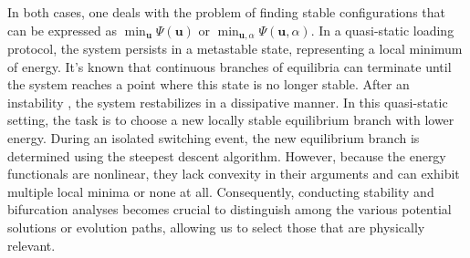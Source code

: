 In both cases, one deals with the problem of finding  stable configurations that  can be expressed as $\min_{\boldsymbol{u}} \Psi(\boldsymbol{u})$ or $\min_{\boldsymbol{u},\alpha} \Psi(\boldsymbol{u},\alpha)$.  In a quasi-static loading protocol, the system persists in a metastable state, representing a local minimum of energy. 
It's known that continuous branches of equilibria can terminate until the system reaches a point where this state is no longer stable. 
After an instability , the system restabilizes  in a dissipative manner. 
In this quasi-static setting, the task is to choose a new locally stable equilibrium branch with lower energy. 
During an isolated switching event, the new equilibrium branch is determined using the steepest descent algorithm. However, because the energy functionals are nonlinear, they  lack convexity in their arguments and can exhibit multiple local minima or none at all. Consequently, conducting stability and bifurcation analyses becomes crucial to distinguish among the various potential solutions or evolution paths, allowing us to select those that are physically relevant.
